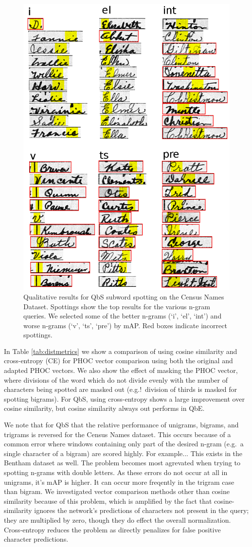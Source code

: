 \documentclass[ms,electronic,twosidetoc,letterpaper,chaptercenter,parttop,lof,lot]{byumsphd}
\begin{document}
\begin{figure}
    \centering
    \includegraphics[width=.6\textwidth]{qualSpotNames}
    \caption{Qualitative results for QbS subword spotting on the Census Names Dataset. Spottings show the top results for the various n-gram queries. We selected some of the better n-grams (`i', `el', `int') and worse n-grams (`v', `ts', `pre') by mAP. Red boxes indicate incorrect spottings.
    }
    \label{fig:qualSpotNames}
\end{figure}

In Table \ref{tab:distmetrics} we show a comparison of using cosine similarity and cross-entropy (CE) for PHOC vector comparison using both the original and adapted PHOC vectors. We also show the effect of masking the PHOC vector, where divisions of the word which do not divide evenly with the number of characters being spotted are masked out (e.g.!~division of thirds is masked for spotting bigrams). For QbS, using cross-entropy shows a large improvement over cosine similarity, but cosine similarity always out performs in QbE.

We note that for QbS that the relative performance of unigrams, bigrams, and trigrams is reversed for the Census Names dataset. This occurs because of a common error where windows containing only part of the desired n-gram (e.g.~a single character of a bigram) are scored highly. For example...
This exists in the Bentham dataset as well.
The problem becomes most agrevated when trying to spotting n-grams with double letters. As these errors do not occur at all in unigrams, it's mAP is higher. It can occur more freqently in the trigram case than bigram.
We investigated vector comparison methods other than cosine similarity because of this problem, which is amplified by the fact that cosine-similarity ignores the network's predictions of characters not present in the query; they are multiplied by zero, though they do effect the overall normalization. Cross-entropy reduces the problem as directly penalizes for false positive character predictions.
\end{document}
